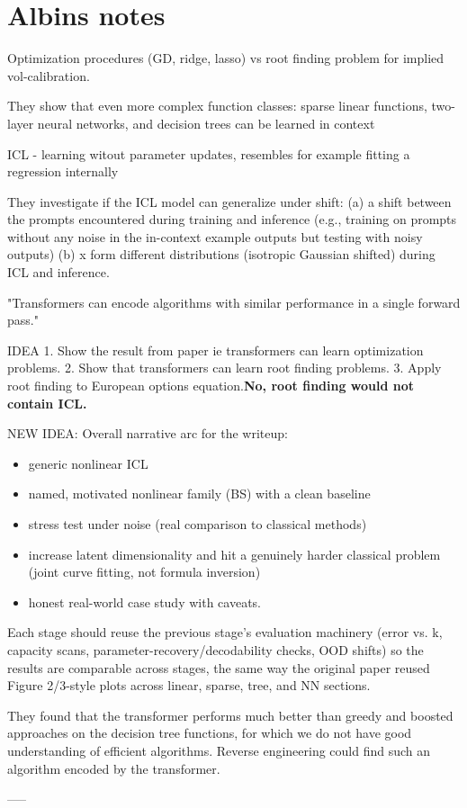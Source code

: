 \section{Albins notes
}


Optimization procedures (GD, ridge, lasso) vs root finding problem for implied vol-calibration.

They show that even more complex function classes: sparse linear functions, two-layer neural networks, and decision trees can be learned in context

ICL - learning witout parameter updates, resembles for example fitting a regression internally

They investigate if the ICL model can generalize under shift: (a) a shift between the prompts encountered during training and inference (e.g.,
training on prompts without any noise in the in-context example outputs but testing with noisy outputs)
(b) x form different distributions (isotropic Gaussian shifted) during ICL and inference.

"Transformers can encode algorithms with similar performance in a single forward pass."

IDEA 1. Show the result from paper ie transformers can learn optimization problems. 2. Show that transformers can learn root finding problems. 3. Apply root finding to European options equation.\textbf{No, root finding would not contain ICL.}

NEW IDEA: Overall narrative arc for the writeup: \begin{itemize}
    \item generic nonlinear ICL
    \item named, motivated nonlinear family (BS) with a clean baseline
    \item stress test under noise (real comparison to classical methods)
    \item increase latent dimensionality and hit a genuinely harder classical problem (joint curve fitting, not formula inversion)
    \item honest real-world case study with caveats. \end{itemize}
Each stage should reuse the previous stage's evaluation machinery (error vs. k, capacity scans, parameter-recovery/decodability checks, OOD shifts) so the results are comparable across stages, the same way the original paper reused Figure 2/3-style plots across linear, sparse, tree, and NN sections.

They found that the transformer performs much better than greedy and boosted approaches on the decision tree functions, for which we do not have good understanding of efficient algorithms. Reverse engineering could find such an algorithm encoded by the transformer.

-----